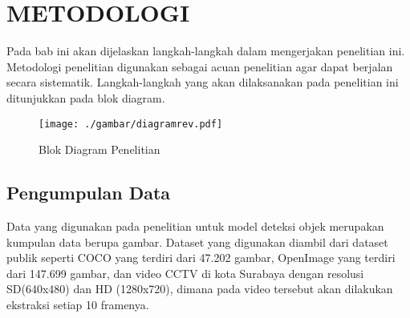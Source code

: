 \chapter{METODOLOGI}

Pada bab ini akan dijelaskan langkah-langkah dalam mengerjakan penelitian ini. Metodologi penelitian digunakan sebagai acuan penelitian agar dapat berjalan secara sistematik. Langkah-langkah yang akan dilaksanakan pada penelitian ini ditunjukkan pada blok diagram.

\begin{figure}[ht]
	\centering
	\texttt{[image: ./gambar/diagramrev.pdf]}
	\caption{Blok Diagram Penelitian}
	\label{fig:diagrammetodologi}
\end{figure}

\section{Pengumpulan Data}
Data yang digunakan pada penelitian untuk model deteksi objek merupakan kumpulan data berupa gambar. Dataset yang digunakan diambil dari dataset publik seperti COCO \autocite{DBLP:journals/corr/LinMBHPRDZ14} yang terdiri dari 47.202 gambar, OpenImage \autocite{DBLP:journals/corr/abs-1811-00982} yang terdiri dari 147.699 gambar, dan video CCTV di kota Surabaya dengan resolusi SD(640x480) dan HD (1280x720), dimana pada video tersebut akan dilakukan ekstraksi setiap 10 framenya.

